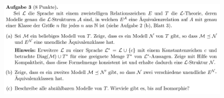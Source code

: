 \documentclass[a4paper]{scrartcl}
\begin{document}

\section*{}%
\label{sec:aufgabe_3}

    \begin{figure}[H]
        \centering
        \includegraphics[scale=0.3]{./A-3.png}
        \label{fig:}
    \end{figure}
\end{document}
